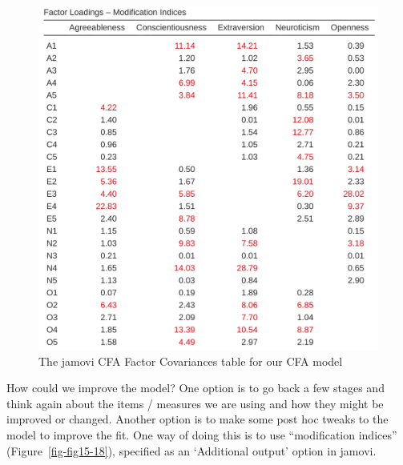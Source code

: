 \documentclass[
  a4paper,
]{book}
\begin{document}
\begin{figure}

\includegraphics[width=1\textwidth,height=\textheight]{images/fig15-17.png} \hfill{}

\caption{\label{fig-fig15-17}The jamovi CFA Factor Covariances table for
our CFA model}

\end{figure}

How could we improve the model? One option is to go back a few stages
and think again about the items / measures we are using and how they
might be improved or changed. Another option is to make some post hoc
tweaks to the model to improve the fit. One way of doing this is to use
``modification indices'' (Figure~\ref{fig-fig15-18}), specified as an
`Additional output' option in jamovi.
\end{document}
